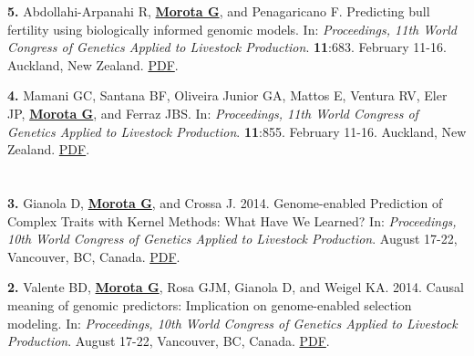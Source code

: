 \documentclass[margin,line,10pt]{res}
\newenvironment{list1}{
  \begin{list}{\ding{113}}{%
      \setlength{\itemsep}{0in}
      \setlength{\parsep}{0in} \setlength{\parskip}{0in}
      \setlength{\topsep}{0in} \setlength{\partopsep}{0in} 
      \setlength{\leftmargin}{0.17in}}}{\end{list}}
\begin{document}
\begin{resume}
\begin{list1}
\vspace{0.5cm}

\item [\bf{5}.] Abdollahi-Arpanahi R, {\bf \underline{Morota G}}, and Penagaricano F. Predicting bull fertility using biologically informed genomic models.  In: \emph{Proceedings, 11th World Congress of Genetics Applied to Livestock Production}. \textbf{11}:683. February 11-16. Auckland, New Zealand. \textcolor{blue}{\href{http://www.wcgalp.org/proceedings/2018/predicting-bull-fertility-using-biologically-informed-genomic-models}{PDF}}.  

  \vspace{0.5cm}
  
\item [\bf{4}.] Mamani GC, Santana BF, Oliveira Junior GA, Mattos E, Ventura RV, Eler JP, {\bf \underline{Morota G}}, and Ferraz JBS. In: \emph{Proceedings, 11th World Congress of Genetics Applied to Livestock Production}. \textbf{11}:855. February 11-16. Auckland, New Zealand. \textcolor{blue}{\href{http://www.wcgalp.org/proceedings/2018/effect-inbreeding-productive-traits-nellore-cattle}{PDF}}.  

  
\end{list1}

\section{}
\begin{list1}
\item [\bf{3}.] Gianola D, {\bf \underline{Morota G}}, and Crossa J. 2014. 
Genome-enabled Prediction of Complex Traits with Kernel Methods: What Have We Learned? In: \emph{Proceedings, 10th World Congress of Genetics Applied to Livestock Production}. August 17-22, Vancouver, BC, Canada. 
\textcolor{blue}{\href{http://www.morotalab.org/publications/pdf/gianola2014WCGALP.pdf}{PDF}}.  


\vspace{0.5cm}

\item [\bf{2}.] Valente BD, {\bf \underline{Morota G}}, Rosa GJM, Gianola D, and  Weigel KA. 2014. 
Causal meaning of genomic predictors: Implication on genome-enabled selection modeling. In: \emph{Proceedings, 10th World Congress of Genetics Applied to Livestock Production}. August 17-22, Vancouver, BC, Canada. 
\textcolor{blue}{\href{http://www.morotalab.org/publications/pdf/valente2014WCGALP.pdf}{PDF}}.  
\end{list1}



\end{resume}
\end{document}
